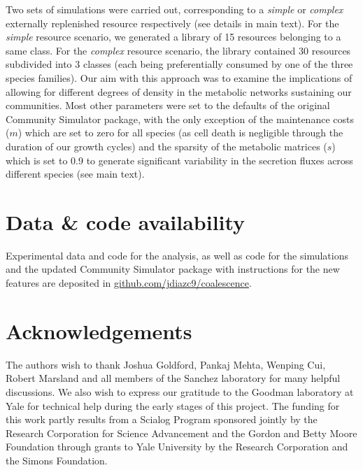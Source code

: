 \documentclass[a4paper,10pt]{article}
\begin{document}
Two sets of simulations were carried out, corresponding to a
\textit{simple} or \textit{complex} externally replenished resource respectively
(see details in main text).
For the \textit{simple} resource scenario, we generated a library of 15 resources
belonging to a same class. For the \textit{complex} resource scenario,
the library contained 30 resources subdivided into 3 classes
(each being preferentially consumed by one of the three species families).
Our aim with this approach was to examine the implications of allowing for
different degrees of density in the metabolic networks sustaining our communities.
Most other parameters were set to the defaults of the original Community Simulator
package, with the only exception of the maintenance costs ($m$) which are set to
zero for all species (as cell death is negligible through the duration of our growth cycles)
and the sparsity of the metabolic matrices ($s$) which is set to 0.9
to generate significant variability in the secretion fluxes across different species
(see main text).

\section*{Data \& code availability}\label{datacode}

Experimental data and code for the analysis, as well as code for the simulations
and the updated Community Simulator package with instructions for the
new features are deposited in \url{github.com/jdiazc9/coalescence}.

\section*{Acknowledgements}

The authors wish to thank Joshua Goldford, Pankaj Mehta, Wenping Cui,
Robert Marsland and all members of the Sanchez laboratory
for many helpful discussions.
We also wish to express our gratitude to the Goodman laboratory at Yale
for technical help during the early stages of this project.
The funding for this work partly results from a Scialog Program
sponsored jointly by the Research Corporation for Science Advancement and
the Gordon and Betty Moore Foundation through grants to Yale University by the
Research Corporation and the Simons Foundation.








\clearpage
\end{document}
